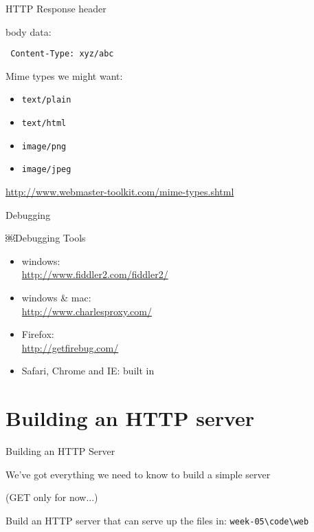 \documentclass{beamer}
\begin{document}
\begin{frame}[fragile]{HTTP Response header}

{\Large body data:

\vfill
\verb| Content-Type: xyz/abc | 

\vfill
Mime types we might want:
}

\begin{itemize}
  \item \verb|text/plain|
  \item \verb|text/html|
  \item \verb|image/png|
  \item \verb|image/jpeg|
\end{itemize}

\vfill
\url{http://www.webmaster-toolkit.com/mime-types.shtml}
\end{frame}

\begin{frame}[fragile]{Debugging}

{\Large￼Debugging Tools}

\begin{itemize}
  \item windows:\\
    \url{http://www.fiddler2.com/fiddler2/}
  \item windows \& mac:\\
    \url{http://www.charlesproxy.com/}
  \item Firefox:\\ 
    \url{http://getfirebug.com/}
  \item Safari, Chrome and IE: built in
\end{itemize}

\end{frame}

\section{Building an HTTP server}

\begin{frame}[fragile]{Building an HTTP Server}

\vfill
{\Large We've got everything we need to know to build a simple server}

\vfill
(GET only for now...)

\vfill
{\LARGE Build an HTTP server that can serve up the files in:
\verb|week-05\code\web|}\\

\end{frame}
\end{document}
